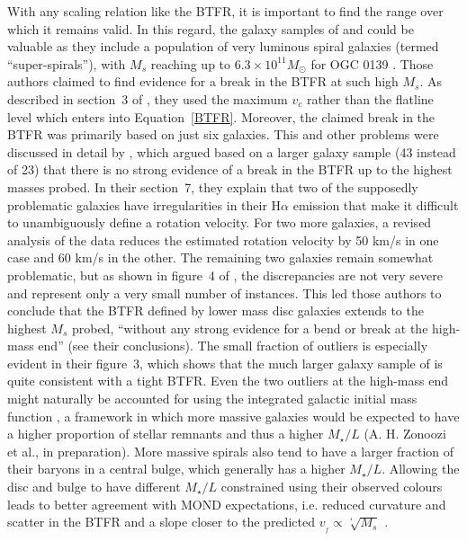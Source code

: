 \documentclass[fleqn,usenatbib,useAMS,onecolumn]{mnras} %
\begin{document}
With any scaling relation like the BTFR, it is important to find the range over which it remains valid. In this regard, the galaxy samples of \citet{Ogle_2016} and \citet{Ogle_2019_catalogue} could be valuable as they include a population of very luminous spiral galaxies (termed ``super-spirals''), with $M_s$ reaching up to $6.3 \times 10^{11} M_\odot$ for OGC 0139 \citep{Ogle_2019}. Those authors claimed to find evidence for a break in the BTFR at such high $M_s$. As described in section~3 of \citet{Ogle_2019}, they used the maximum $v_c$ rather than the flatline level which enters into Equation~\ref{BTFR}. Moreover, the claimed break in the BTFR was primarily based on just six galaxies. This and other problems were discussed in detail by \citet{Teodoro_2021}, which argued based on a larger galaxy sample (43 instead of 23) that there is no strong evidence of a break in the BTFR up to the highest masses probed. In their section~7, they explain that two of the supposedly problematic galaxies have irregularities in their H$\alpha$ emission that make it difficult to unambiguously define a rotation velocity. For two more galaxies, a revised analysis of the data reduces the estimated rotation velocity by 50 km/s in one case and 60 km/s in the other. The remaining two galaxies remain somewhat problematic, but as shown in figure~4 of \citet{Teodoro_2021}, the discrepancies are not very severe and represent only a very small number of instances. This led those authors to conclude that the BTFR defined by lower mass disc galaxies extends to the highest $M_s$ probed, ``without any strong evidence for a bend or break at the high-mass end'' (see their conclusions). The small fraction of outliers is especially evident in their figure~3, which shows that the much larger galaxy sample of \citet{Posti_2018} is quite consistent with a tight BTFR. Even the two outliers at the high-mass end might naturally be accounted for using the integrated galactic initial mass function \citep[IGIMF;][]{Kroupa_2003, Weidner_2006, Jerabkova_2018, Yan_2021}, a framework in which more massive galaxies would be expected to have a higher proportion of stellar remnants and thus a higher $M_{\star}/L$ (A. H. Zonoozi et al., in preparation). More massive spirals also tend to have a larger fraction of their baryons in a central bulge, which generally has a higher $M_{\star}/L$. Allowing the disc and bulge to have different $M_{\star}/L$ constrained using their observed colours leads to better agreement with MOND expectations, i.e. reduced curvature and scatter in the BTFR and a slope closer to the predicted $v_{_f} \propto \sqrt[^4]{M_s}$ \citep*{Schombert_2022}.
\end{document}

